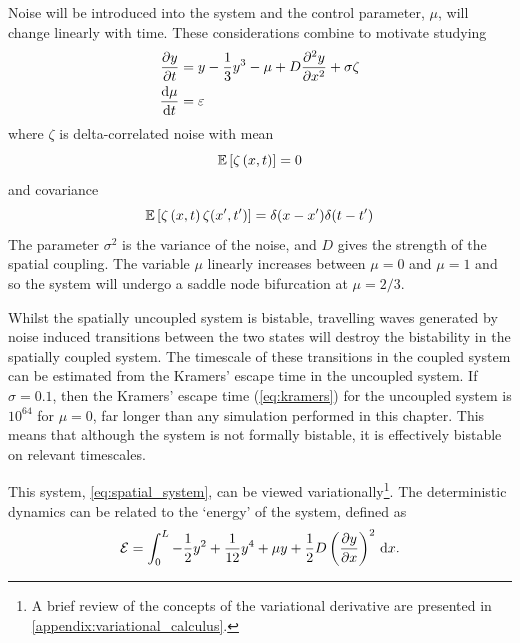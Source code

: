 Noise will be introduced into the system and the control parameter, $\mu$,  will change linearly with time. These considerations combine to motivate studying
\begin{subequations}
\label{eq:spatial_system}
  \begin{align}
    \pdv{y}{t} &= y - \frac{1}{3}y^3 - \mu + D\pdv[2]{y}{x} + \sigma\zeta \label{eq:spatial_system_y} \\
    \dv{\mu}{t}&= \varepsilon \label{eq:spatial_system_mu}
  \end{align}
\end{subequations}
where $\zeta$ is delta-correlated noise with mean
\begin{equation}
  \label{eq:delta_mean}
  \operatorname*{\mathbb{E}} \left[\zeta\left(x,t\right)\right] = 0 
\end{equation}
and covariance
\begin{equation}
  \label{eq:delta_cov}
  \operatorname*{\mathbb{E}} \left[\zeta\left(x,t\right)\zeta(x',t')\right] = \delta(x-x')\delta(t-t') 
\end{equation}
The parameter $\sigma^2$ is the variance of the noise, and $D$ gives the strength of the spatial coupling.
The variable $\mu$ linearly increases between $\mu = 0$ and $\mu = 1$ and so the system will undergo a saddle node bifurcation at $\mu = 2/3$.

Whilst the spatially uncoupled system is bistable, travelling waves \parencite{VanDeLeemput2015} generated by noise induced transitions between the two 
states will destroy the bistability in the spatially coupled system. The timescale of these transitions in the coupled system
can be estimated from the Kramers' escape time in the uncoupled system. If $\sigma = 0.1$, then the
Kramers' escape time (\cref{eq:kramers}) for the uncoupled system is $10^{64}$ for $\mu = 0$, far longer than any simulation performed in this chapter. This means that although
the system is not formally bistable, it is effectively bistable on relevant timescales.

This system, \cref{eq:spatial_system}, can be viewed variationally\footnote{A brief review of the concepts of the variational derivative are presented in \cref{appendix:variational_calculus}.}.
The deterministic dynamics can be related to the `energy' of the system, defined as
\begin{equation}
  \label{eq:spatial_system_energy}
  \mathcal{E} = \int_0^L -\frac{1}{2}y^2 + \frac{1}{12}y^4 + \mu y + \frac{1}{2}D\left(\pdv{y}{x}\right)^2\,\mathrm{d}{x}.
\end{equation}

